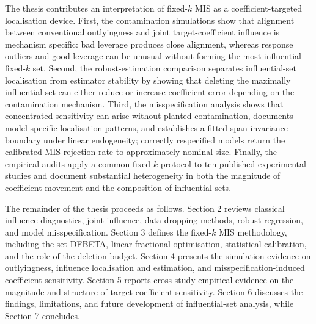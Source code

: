 \documentclass[../main.tex]{subfiles}
\begin{document}
The thesis contributes an interpretation of fixed-\(k\) MIS as a coefficient-targeted localisation device. First, the contamination simulations show that alignment between conventional outlyingness and joint target-coefficient influence is mechanism specific: bad leverage produces close alignment, whereas response outliers and good leverage can be unusual without forming the most influential fixed-\(k\) set. Second, the robust-estimation comparison separates influential-set localisation from estimator stability by showing that deleting the maximally influential set can either reduce or increase coefficient error depending on the contamination mechanism. Third, the misspecification analysis shows that concentrated sensitivity can arise without planted contamination, documents model-specific localisation patterns, and establishes a fitted-span invariance boundary under linear endogeneity; correctly respecified models return the calibrated MIS rejection rate to approximately nominal size. Finally, the empirical audits apply a common fixed-\(k\) protocol to ten published experimental studies and document substantial heterogeneity in both the magnitude of coefficient movement and the composition of influential sets.

The remainder of the thesis proceeds as follows. Section 2 reviews classical influence diagnostics, joint influence, data-dropping methods, robust regression, and model misspecification. Section 3 defines the fixed-\(k\) MIS methodology, including the set-DFBETA, linear-fractional optimisation, statistical calibration, and the role of the deletion budget. Section 4 presents the simulation evidence on outlyingness, influence localisation and estimation, and misspecification-induced coefficient sensitivity. Section 5 reports cross-study empirical evidence on the magnitude and structure of target-coefficient sensitivity. Section 6 discusses the findings, limitations, and future development of influential-set analysis, while Section 7 concludes.
\end{document}
